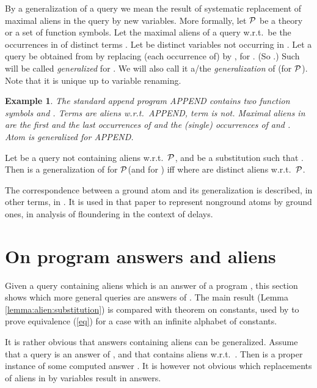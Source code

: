 \documentclass[a4paper]{tlp2}
\newtheorem{example}[theorem]{Example}
\renewcommand*{\P}{{\ensuremath{\cal P}}\xspace}
\begin{document}
By a generalization of a query we mean the result of systematic replacement
of maximal aliens in the query by new variables.  More formally, 
let \P be a theory or a set of function symbols.
Let the maximal aliens of a query  w.r.t.\ 
be the occurrences in  of distinct terms .
Let  be distinct variables not occurring in .
Let a query  be
obtained from  by replacing (each occurrence of) 
 by , for .  
(So .)
Such  will be called
{\em  generalized} for .
We will also call it a/the {\em generalization} of  (for \P).
Note that it is unique up to variable renaming. 

\begin{example}
The standard append program APPEND \cite[p.\,127]{Apt-Prolog}
contains two function symbols   and .
Terms  are aliens w.r.t.\ APPEND, term  is not.
Maximal aliens in 
are the first and the last occurrences of  and the (single) occurrences of
  and .
Atom 
is  generalized for APPEND.
\end{example}

Let  be a query not containing aliens w.r.t.\ \P, and 
 be a substitution such that .
Then  is a generalization of   for \P (and for )
    iff  
    where  are distinct aliens w.r.t.\ \P.



 The correspondence between a ground atom and its generalization
 is described, in other terms, in
 \cite[Def.\,4]{naish.tplp.floundering14}.
It is used in that paper to represent nonground atoms by
 ground ones, in analysis of floundering in the context of delays.


\section{On program answers and aliens}
\label{sec:lemma}



Given a query containing aliens which is an answer of a program ,
this section shows which more general queries are answers of .
The main result (Lemma \ref{lemma:alien:substitution})
is compared with theorem on constants,
used by \cite{DBLP:books/mk/minker88/Maher88} to prove 
equivalence (\ref{eq}) for a case with an infinite alphabet of constants.

It is rather obvious that answers containing aliens can be generalized.
Assume that a query
  is an answer of , and that  contains aliens w.r.t.\ . 
Then  is
a proper instance of some computed answer .
It is however not obvious which replacements of aliens in  by variables 
result in answers.
\end{document}
